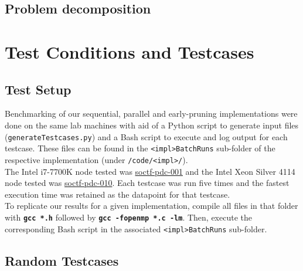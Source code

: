 \documentclass[12pt]{article}
\newcommand{\bt}[1]{\texttt{\textbf{#1}}}
\begin{document}
\subsection{Problem decomposition}


\pagebreak

\section{Test Conditions and Testcases}

\subsection{Test Setup}


Benchmarking of our sequential, parallel and early-pruning implementations were done on the same lab machines with aid of a Python script to generate input files (\texttt{generateTestcases.py}) and a Bash script to execute and log output for each testcase. These files can be found in the \texttt{<impl>BatchRuns} sub-folder of the respective implementation (under \texttt{/code/<impl>/}). \\ %

The Intel i7-7700K node tested was \ul{soctf-pdc-001} and the Intel Xeon Silver 4114 node tested was \ul{soctf-pdc-010}. Each testcase was run five times and the fastest execution time was retained as the datapoint for that testcase. \\

To replicate our results for a given implementation, compile all files in that folder with \bt{gcc *.h} followed by \bt{gcc -fopenmp *.c -lm}. Then, execute the corresponding Bash script in the associated \texttt{<impl>BatchRuns} sub-folder. %

\subsection{Random Testcases}

\end{document}
